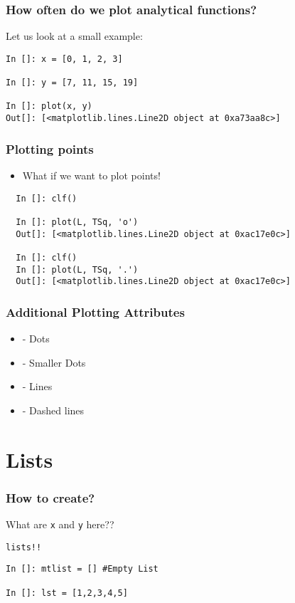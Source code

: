 \documentclass[14pt,compress]{beamer}
\newcommand{\typ}[1]{\lstinline{#1}}
\newcommand{\kwrd}[1]{ \texttt{\textbf{\color{blue}{#1}}}  }
\begin{document}
\begin{frame}[fragile]
\frametitle{How often do we plot analytical functions?}
Let us look at a small example:
\begin{lstlisting}
In []: x = [0, 1, 2, 3]

In []: y = [7, 11, 15, 19]

In []: plot(x, y)
Out[]: [<matplotlib.lines.Line2D object at 0xa73aa8c>]
\end{lstlisting}
\end{frame}

\begin{frame}[fragile]
\frametitle{Plotting points}
\begin{itemize}
\item What if we want to plot points!
\end{itemize}
\begin{lstlisting}
  In []: clf()

  In []: plot(L, TSq, 'o')
  Out[]: [<matplotlib.lines.Line2D object at 0xac17e0c>]

  In []: clf()
  In []: plot(L, TSq, '.')
  Out[]: [<matplotlib.lines.Line2D object at 0xac17e0c>]
\end{lstlisting}
\end{frame}

\begin{frame}[fragile]
\frametitle{Additional Plotting Attributes}
\begin{itemize}
  \item \kwrd{'o'} - Dots
  \item \kwrd{'.'} - Smaller Dots
  \item \kwrd{'-'} - Lines
  \item \kwrd{'- -'} - Dashed lines
\end{itemize}
\end{frame}

\section{Lists}
\begin{frame}[fragile]
  \frametitle{How to create?}
What are \typ{x} and \typ{y} here??\\
\begin{center}
\alert{\typ{lists!!}}
\end{center}
\begin{lstlisting}
In []: mtlist = [] #Empty List

In []: lst = [1,2,3,4,5] 
\end{lstlisting}
\end{frame}
\end{document}

